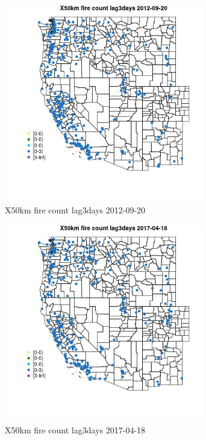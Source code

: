 \begin{figure} 
\centering  
\includegraphics[width=0.77\textwidth]{Code_Outputs/Report_ML_input_PM25_Step4_part_e_de_duplicated_aves_compiled_2019-05-14wNAs_MapObsX50km_fire_count_lag3days2012-09-20.jpg} 
\caption{\label{fig:Report_ML_input_PM25_Step4_part_e_de_duplicated_aves_compiled_2019-05-14wNAsMapObsX50km_fire_count_lag3days2012-09-20}X50km fire count lag3days 2012-09-20} 
\end{figure} 
 

\begin{figure} 
\centering  
\includegraphics[width=0.77\textwidth]{Code_Outputs/Report_ML_input_PM25_Step4_part_e_de_duplicated_aves_compiled_2019-05-14wNAs_MapObsX50km_fire_count_lag3days2017-04-18.jpg} 
\caption{\label{fig:Report_ML_input_PM25_Step4_part_e_de_duplicated_aves_compiled_2019-05-14wNAsMapObsX50km_fire_count_lag3days2017-04-18}X50km fire count lag3days 2017-04-18} 
\end{figure} 
 

